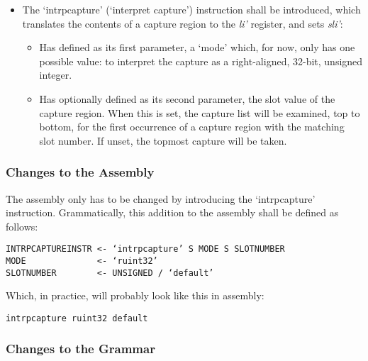 \begin{itemize}
    \item The ‘intrpcapture’ (‘interpret capture’) instruction shall 
be introduced, which translates the contents of a capture region to the 
\textit{li’} register, and sets \textit{sli’}:
    \begin{itemize}
        \item Has defined as its first parameter, a ‘mode’ which, for 
now, only has one possible value: to interpret the capture as a 
right-aligned, 32-bit, unsigned integer.
        \item Has optionally defined as its second parameter, the slot value 
of the capture region. When this is set, the capture list will be 
examined, top to bottom, for the first occurrence of a capture region with 
the matching slot number. If unset, the topmost capture will be taken.
    \end{itemize}
\end{itemize}

\subsubsection{Changes to the Assembly}

The assembly only has to be changed by introducing the ‘intrpcapture’ 
instruction.
Grammatically, this addition to the assembly shall be defined as follows:

\begin{changemargin}{-60mm}{0mm}
\begin{myquote}
\begin{verbatim}
INTRPCAPTUREINSTR <- ‘intrpcapture’ S MODE S SLOTNUMBER
MODE              <- ‘ruint32’
SLOTNUMBER        <- UNSIGNED / ‘default’
\end{verbatim}
\end{myquote}
\end{changemargin}

Which, in practice, will probably look like this in assembly:

\begin{changemargin}{-60mm}{0mm}
\begin{myquote}
\begin{verbatim}
intrpcapture ruint32 default
\end{verbatim}
\end{myquote}
\end{changemargin}

\subsubsection{Changes to the Grammar}

